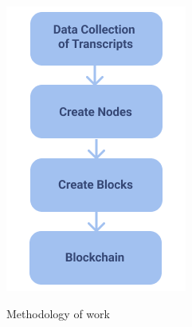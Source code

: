 \begin{figure}[h]
    \centering
    \includegraphics[scale=0.7]{images/Methodology.png}\\[0.5cm]
    \caption{Methodology of work}
    \label{fig:my_label}
\end{figure}

